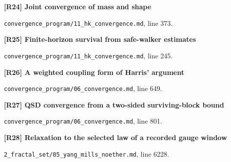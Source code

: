 \documentclass[11pt,a4paper]{article}
\begin{document}
\par\medskip\noindent\begin{minipage}{\linewidth}\textbf{[R24] Joint convergence of mass and shape}\label{src:thm-hk-convergence-main-assembly}\par
{\small\texttt{}\par
\nolinkurl{convergence_program/11_hk_convergence.md}, line 373.\par}
\end{minipage}\par

\par\medskip\noindent\begin{minipage}{\linewidth}\textbf{[R25] Finite-horizon survival from safe-walker estimates}\label{src:thm-exponential-survival}\par
{\small\texttt{}\par
\nolinkurl{convergence_program/11_hk_convergence.md}, line 245.\par}
\end{minipage}\par

\par\medskip\noindent\begin{minipage}{\linewidth}\textbf{[R26] A weighted coupling form of Harris' argument}\label{src:thm-convergence-conservative-harris}\par
{\small\texttt{}\par
\nolinkurl{convergence_program/06_convergence.md}, line 649.\par}
\end{minipage}\par

\par\medskip\noindent\begin{minipage}{\linewidth}\textbf{[R27] QSD convergence from a two-sided surviving-block bound}\label{src:thm-main-convergence}\par
{\small\texttt{}\par
\nolinkurl{convergence_program/06_convergence.md}, line 801.\par}
\end{minipage}\par

\par\medskip\noindent\begin{minipage}{\linewidth}\textbf{[R28] Relaxation to the selected law of a recorded gauge window}\label{src:thm-ym-qsd-window-relaxation}\par
{\small\texttt{}\par
\nolinkurl{2_fractal_set/05_yang_mills_noether.md}, line 6228.\par}
\end{minipage}\par
\end{document}
